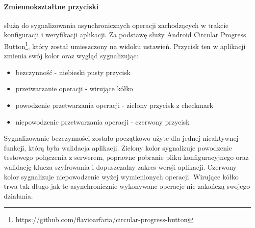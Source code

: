 \documentclass{report}
\begin{document}
				\paragraph{Zmiennokształtne przyciski}
				służą do sygnalizowania asynchronicznych operacji zachodzących w trakcie konfiguracji i weryfikacji aplikacji. Za podstawę służy Android Circular Progress Button\footnote{https://github.com/flavioarfaria/circular-progress-button}, który został umieszczony na widoku ustawień. Przycisk ten w aplikacji zmienia swój kolor oraz wygląd sygnalizując:
				\begin{itemize}
					\item bezczynność - niebieski pusty przycisk
					\item przetwarzanie operacji - wirujące kółko
					\item powodzenie przetwarzania operacji - zielony przycisk z checkmark
					\item niepowodzenie przetwarzania operacji - czerwony przycisk 
				\end{itemize}
				Sygnalizowanie bezczynności zostało początkowo użyte dla jednej nieaktywnej funkcji, którą była walidacja aplikacji. Zielony kolor sygnalizuje powodzenie testowego połączenia z serwerem, poprawne pobranie pliku konfiguracyjnego oraz walidację klucza szyfrowania i dopuszczalny zakres wersji aplikacji.
				Czerwony kolor sygnalizuje niepowodzenie wyżej wymienionych operacji.
				Wirujące kółko trwa tak długo jak te asynchronicznie wykonywane operacje nie zakończą swojego działania.\\
				
\end{document}
